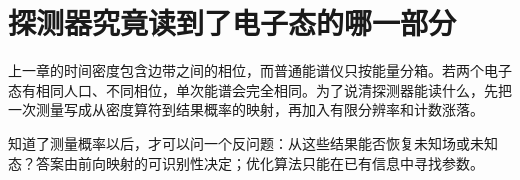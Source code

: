 \chapter{探测器究竟读到了电子态的哪一部分}
\label{chap:feqo-measurement-inference}

上一章的时间密度包含边带之间的相位，而普通能谱仪只按能量分箱。若两个电子态有相同人口、不同相位，单次能谱会完全相同。为了说清探测器能读什么，先把一次测量写成从密度算符到结果概率的映射，再加入有限分辨率和计数涨落。



知道了测量概率以后，才可以问一个反问题：从这些结果能否恢复未知场或未知态？答案由前向映射的可识别性决定；优化算法只能在已有信息中寻找参数。


